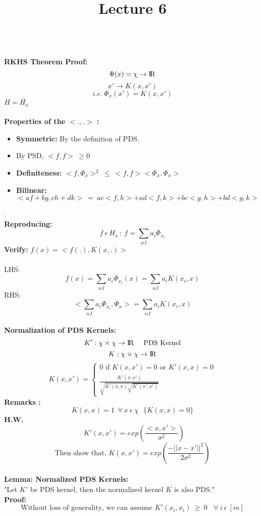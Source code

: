 \documentclass{article}
\begin{document}
	\sffamily
	\title{Lecture 6}
	\maketitle
	\textbf{\\RKHS Theorem Proof:}
	\\	
	$$\Phi(x) = \chi \rightarrow \rm I\!R$$
	$$x'\rightarrow K(x,x')$$
	$$i.e.~\Phi_x(x')=K(x,x')$$
	$H=\bar{H_o}$
	\\\\
	\textbf{Properties of the $<.,.>$ :}
	\begin{itemize}
		\item \textbf{Symmetric:} By the definition of PDS.
		\item By PSD, $<f,f>~\geq 0$
		\item \textbf{Definiteness:} $<f,\Phi_x>^2~\leq~<f,f><\Phi_x,\Phi_x>$
		\item \textbf{Bilinear:} $<af+bg,ch+dk>~=~ac<f,h>+ad<f,k>+bc<g,h>+bd<g,k>$ 
	\end{itemize}
    .\\
    \textbf{Reproducing:}
    $$f~\epsilon~H_o~:~f=\sum_{i\epsilon I}a_i\Phi_{x_i}$$
    \textbf{Verify:} $f(x)=<f(.),K(x,.)>$
    \\\\
    LHS: $$f(x)=\sum_{i\epsilon I}a_i\Phi_{x_i}(x)=\sum_{i\epsilon I}a_i K(x_i,x)$$
    RHS: $$<\sum_{i\epsilon I}a_i\Phi_{x_i},\Phi_x>=\sum_{i\epsilon I}a_iK(x_i,x)$$
    \\
    \textbf{Normalization of PDS Kernels:}
    $$K':\chi \times \chi \rightarrow \rm I\!R~~~~PDS~Kernel$$
    $$K:\chi \times \chi \rightarrow \rm I\!R$$
    \[
      K(x,x')=
              \begin{cases}
               0 \text{ if } K(x,x')=0 \text{ or } K'(x,x)=0 \\
               \frac{K'(x,x')}{\sqrt{K'(x,x)\sqrt{K'(x',x')}}}
              \end{cases}
    \]
    \textbf{Remarks :}
    $$K(x,x)=1~~\forall~x~\epsilon~\chi~~~\{K(x,x)=0\}$$
    \textbf{H.W.}$$~~K'(x,x')=exp(\frac{<x,x'>}{\sigma^2})$$
    $$\text{Then show that, }K(x,x')=exp(\frac{-||x-x'||^2}{2\sigma^2})$$
    \\
    \textbf{Lemma: Normalized PDS Kernels:}\\
    "Let $K'$ be PDS kernel, then the normalized kernel $K$ is also PDS."\\
    \textbf{Proof:}
    $$\text{Without loss of generality, we can assume }K'(x_i,x_i)~\geq~0~~~~\forall~i~\epsilon~[m]$$
\end{document}
